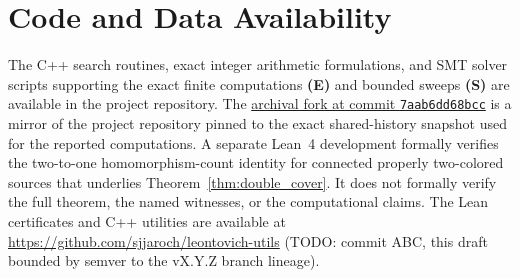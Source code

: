 \section*{Code and Data Availability}
The C++ search routines, exact integer arithmetic formulations, and SMT
solver scripts supporting the exact finite computations \textbf{(E)}
and bounded sweeps \textbf{(S)} are available in the project
repository. The
\href{https://github.com/sjjaroch/leontovich-utils/tree/7aab6dd68bccd7614794c75333dddc692b53541f}{archival fork at commit \texttt{7aab6dd68bcc}}
is a mirror of the project repository pinned to the exact shared-history
snapshot used for the reported computations. A separate Lean~4 development
formally verifies the two-to-one homomorphism-count identity for connected
properly two-colored sources that underlies Theorem~\ref{thm:double_cover}.
It does not formally verify the full theorem, the named witnesses, or the
computational claims. The Lean certificates and C++ utilities are available at
\url{https://github.com/sjjaroch/leontovich-utils}
(TODO: commit ABC, this draft bounded by semver to the vX.Y.Z branch lineage).
